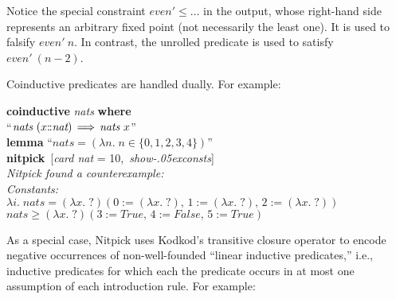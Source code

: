 \documentclass[a4paper,12pt]{article}
\def\Colon{\mathord{:\mkern-1.5mu:}}
\def\unk{{?}}
\def\unkef{(\lambda x.\; \unk)}
\renewcommand\_{\hbox{\textunderscore\kern-.05ex}}
\begin{document}
Notice the special constraint $\textit{even}' \leq \ldots$ in the output, whose
right-hand side represents an arbitrary fixed point (not necessarily the least
one). It is used to falsify $\textit{even}'~n$. In contrast, the unrolled
predicate is used to satisfy $\textit{even}'~(n - 2)$.

Coinductive predicates are handled dually. For example:

\prew
\textbf{coinductive} \textit{nats} \textbf{where} \\
``$\textit{nats}~(x\Colon\textit{nat}) \,\Longrightarrow\, \textit{nats}~x$'' \\[2\smallskipamount]
\textbf{lemma} ``$\textit{nats} = (\lambda n.\; n \mathbin\in \{0, 1, 2, 3, 4\})$'' \\
\textbf{nitpick}~[\textit{card nat} = 10,\, \textit{show\_consts}] \\[2\smallskipamount]
\slshape Nitpick found a counterexample:
\\[2\smallskipamount]
\hbox{}\qquad Constants: \nopagebreak \\
\hbox{}\qquad\qquad $\lambda i.\; \textit{nats} = \unkef(0 := \unkef,\, 1 := \unkef,\, 2 := \unkef)$ \\
\hbox{}\qquad\qquad $\textit{nats} \geq \unkef(3 := \textit{True},\, 4 := \textit{False},\, 5 := \textit{True})$
\postw

As a special case, Nitpick uses Kodkod's transitive closure operator to encode
negative occurrences of non-well-founded ``linear inductive predicates,'' i.e.,
inductive predicates for which each the predicate occurs in at most one
assumption of each introduction rule. For example:
\end{document}
